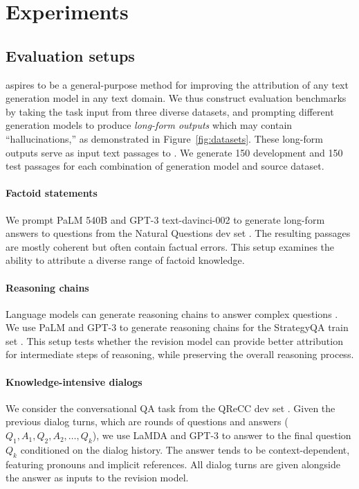 \section{Experiments}\label{sec:experiments}

\subsection{Evaluation setups}\label{sec:eval-setup}



\approach{} aspires to be a general-purpose method for improving the attribution of any text generation model in any text domain.
We thus construct evaluation benchmarks by taking the task input from three diverse datasets,
and prompting different generation models to produce \emph{long-form outputs} which may contain ``hallucinations,''
as demonstrated in Figure~\ref{fig:datasets}.
These long-form outputs serve as input text passages to \approach{}.
We generate 150 development and 150 test passages for each combination of generation model and source dataset. %






\paragraph{Factoid statements}
We prompt PaLM 540B and GPT-3 text-davinci-002 to generate long-form answers to questions from the Natural Questions dev set \cite[NQ;][]{Kwiatkowski2019NaturalQA}. The resulting passages are mostly coherent but often contain factual errors. This setup examines the ability to attribute a diverse range of factoid knowledge.

\paragraph{Reasoning chains}
Language models can generate reasoning chains to answer complex questions \cite{Wei2022COT}. We use PaLM and GPT-3 to generate reasoning chains for the StrategyQA train set \cite[SQA;][]{Geva2021DidAU}.
This setup tests whether the revision model can provide better attribution for intermediate steps of reasoning, while preserving the overall reasoning process.

\paragraph{Knowledge-intensive dialogs}
We consider the conversational QA task from the QReCC dev set \cite{Anantha2021QReCCQ}.
Given the previous dialog turns, which are rounds of questions and answers ($Q_1, A_1, Q_2, A_2, \dots, Q_k$), we use LaMDA and GPT-3 to answer %
to the final question $Q_k$ conditioned on the dialog history.
The answer tends to be context-dependent, featuring pronouns and implicit references. All dialog turns are given alongside the answer as inputs to the revision model.




